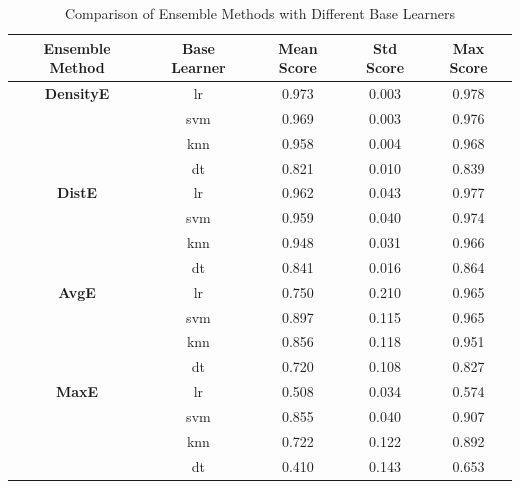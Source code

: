 \documentclass[lettersize,journal]{IEEEtran}
\begin{document}
	\begin{table}[htbp]
		
	    \begin{center}
			
			\caption{Comparison of Ensemble Methods with Different Base Learners}
			
			\label{tab:ensemble_comparison}
			
			\begin{tabular}{|c|c|c|c|c|}
				
				\hline 
				
				\textbf{Ensemble Method} & \textbf{Base Learner} & \textbf{Mean Score} & \textbf{Std Score} & \textbf{Max Score} \\
				
				\hline
				
				\textbf{DensityE} & lr & 0.973 & 0.003 & 0.978 \\
				
				& svm & 0.969 & 0.003 & 0.976 \\
				
				& knn & 0.958 & 0.004 & 0.968 \\
				
				& dt & 0.821 & 0.010 & 0.839 \\
				
				\hline 
				
				\textbf{DistE} & lr & 0.962 & 0.043 & 0.977 \\
				
				& svm & 0.959 & 0.040 & 0.974 \\
				
				& knn & 0.948 & 0.031 & 0.966 \\
				
				& dt & 0.841 & 0.016 & 0.864 \\
				
				\hline 
				
				\textbf{AvgE} & lr & 0.750 & 0.210 & 0.965 \\
				
				& svm & 0.897 & 0.115 & 0.965 \\
				
				& knn & 0.856 & 0.118 & 0.951 \\
				
				& dt & 0.720 & 0.108 & 0.827 \\
				
				\hline 
				
				\textbf{MaxE} & lr & 0.508 & 0.034 & 0.574 \\
				
				& svm & 0.855 & 0.040 & 0.907 \\
				
				& knn & 0.722 & 0.122 & 0.892 \\
				
				& dt & 0.410 & 0.143 & 0.653 \\
				
				\hline
				
			\end{tabular}
			
		\end{center}
		
	\end{table}
	
\end{document}
